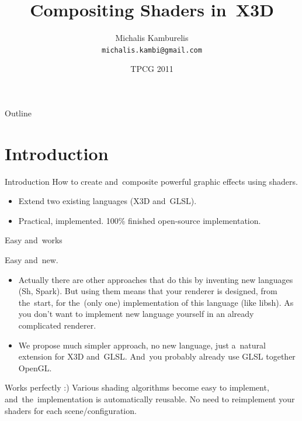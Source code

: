 \documentclass{beamer}
\title{Compositing Shaders in~X3D}
\author[Michalis Kamburelis]{Michalis Kamburelis \\ \texttt{michalis.kambi@gmail.com}}
\institute{Institute of Computer Science\\ University of Wroc{\l}aw, Poland}
\date{TPCG 2011}
\begin{document}
{

  \begin{frame}
    \titlepage
  \end{frame}
}

\begin{frame}{Outline}
  \tableofcontents
\end{frame}

\section{Introduction}

\begin{frame}{Introduction}
How to create and~composite powerful graphic effects using shaders.

\begin{itemize}
  \item Extend two existing languages (X3D and~GLSL).
  \item Practical, implemented. 100\% finished open-source
    implementation.
\end{itemize}
\end{frame}

\begin{frame}{Easy and~works}

Easy and~new.

\begin{itemize}
  \item Actually there are other approaches that do this by inventing
    new languages (Sh, Spark).
    But using them means that your renderer is designed, from the~start,
    for the~(only one) implementation of this language (like libsh).
    As you don't want to implement new language yourself in
    an already complicated renderer.

  \item We propose much simpler approach, no new language, just a~natural
    extension for X3D and~GLSL.
    And~you probably already use GLSL together OpenGL.

\end{itemize}

Works perfectly :) Various shading algorithms become easy to implement,
and~the~implementation is automatically reusable.
No need to reimplement your shaders for each scene/configuration.


\end{frame}
\end{document}
